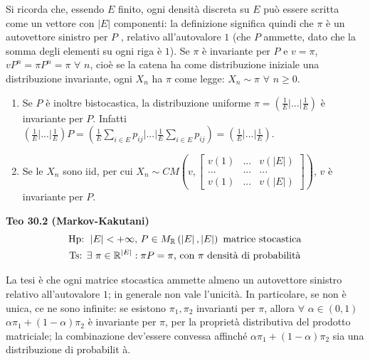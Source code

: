 \documentclass{article}
\begin{document}
Si ricorda che, essendo $E$ finito, ogni densit\`{a} discreta su $E$ pu\`{o}
essere scritta come un vettore con $\left\vert E\right\vert $ componenti: la
definizione significa quindi che $\pi $ \`{e} un autovettore sinistro per $P$%
, relativo all'autovalore $1$ (che $P$ ammette, dato che la somma degli
elementi su ogni riga \`{e} $1$). Se $\pi $ \`{e} invariante per $P$ e $%
v=\pi $, $vP^{n}=\pi P^{n}=\pi $ $\forall $ $n$, cio\`{e} se la catena ha
come distribuzione iniziale una distribuzione invariante, ogni $X_{n}$ ha $%
\pi $ come legge: $X_{n}\sim \pi $ $\forall $ $n\geq 0$.

\begin{enumerate}
\item Se $P$ \`{e} inoltre bistocastica, la distribuzione uniforme $\pi
=\left( \frac{1}{E}|...|\frac{1}{E}\right) $ \`{e} invariante per $P$.
Infatti $\left( \frac{1}{E}|...|\frac{1}{E}\right) P=\left( \frac{1}{E}%
\sum_{i\in E}p_{ij}|...|\frac{1}{E}\sum_{i\in E}p_{ij}\right) =\left( \frac{1%
}{E}|...|\frac{1}{E}\right) $.

\item Se le $X_{n}$ sono iid, per cui $X_{n}\sim CM\left( v,\left[ 
\begin{array}{ccc}
v\left( 1\right) & ... & v\left( \left\vert E\right\vert \right) \\ 
... & ... & ... \\ 
v\left( 1\right) & ... & v\left( \left\vert E\right\vert \right)%
\end{array}%
\right] \right) $, $v$ \`{e} invariante per $P$.
\end{enumerate}

\textbf{Teo 30.2 (Markov-Kakutani)}%
\begin{gather*}
\text{Hp}\text{: }\left\vert E\right\vert <+\infty \text{, }P\in M_{%
\mathbb{R}
}\left( \left\vert E\right\vert ,\left\vert E\right\vert \right) \text{
matrice stocastica} \\
\text{Ts}\text{: }\exists \text{ }\pi \in 
\mathbb{R}
^{\left\vert E\right\vert }:\pi P=\pi \text{, con }\pi \text{ densit\`{a} di
probabilit\`{a}}
\end{gather*}

La tesi \`{e} che ogni matrice stocastica ammette almeno un autovettore
sinistro relativo all'autovalore $1$; in generale non vale l'unicit\`{a}. In
particolare, se non \`{e} unica, ce ne sono infinite: se esistono $\pi
_{1},\pi _{2}$ invarianti per $\pi $, allora $\forall $ $\alpha \in \left(
0,1\right) $ $\alpha \pi _{1}+\left( 1-\alpha \right) \pi _{2}$ \`{e}
invariante per $\pi $, per la propriet\`{a} distributiva del prodotto
matriciale; la combinazione dev'essere convessa affinch\'{e} $\alpha \pi
_{1}+\left( 1-\alpha \right) \pi _{2}$ sia una distribuzione di probabilit%
\`{a}.
\end{document}
